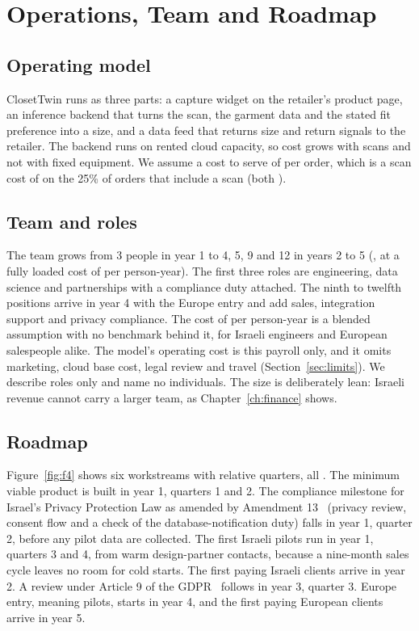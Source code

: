 \chapter{Operations, Team and Roadmap}\label{ch:ops}

\section{Operating model}\label{sec:opmodel}
ClosetTwin runs as three parts: a capture widget on the retailer's product page, an inference backend that turns the scan, the garment data and the stated fit preference into a size, and a data feed that returns size and return signals to the retailer. The backend runs on rented cloud capacity, so cost grows with scans and not with fixed equipment. We assume a cost to serve of  per order, which is a scan cost of  on the 25\% of orders that include a scan (both ).

\section{Team and roles}\label{sec:team}
The team grows from 3 people in year 1 to 4, 5, 9 and 12 in years 2 to 5 (, at a fully loaded cost of  per person-year). The first three roles are engineering, data science and partnerships with a compliance duty attached. The ninth to twelfth positions arrive in year 4 with the Europe entry and add sales, integration support and privacy compliance. The cost of  per person-year is a blended assumption with no benchmark behind it, for Israeli engineers and European salespeople alike. The model's operating cost is this payroll only, and it omits marketing, cloud base cost, legal review and travel (Section~\ref{sec:limits}). We describe roles only and name no individuals. The size is deliberately lean: Israeli revenue cannot carry a larger team, as Chapter~\ref{ch:finance} shows.

\section{Roadmap}\label{sec:roadmap}
Figure~\ref{fig:f4} shows six workstreams with relative quarters, all . The minimum viable product is built in year 1, quarters 1 and 2. The compliance milestone for Israel's Privacy Protection Law as amended by Amendment 13~\cite{il_amend13_2024} (privacy review, consent flow and a check of the database-notification duty) falls in year 1, quarter 2, before any pilot data are collected. The first Israeli pilots run in year 1, quarters 3 and 4, from warm design-partner contacts, because a nine-month sales cycle leaves no room for cold starts. The first paying Israeli clients arrive in year 2. A review under Article 9 of the GDPR~\cite{gdpr2016} follows in year 3, quarter 3. Europe entry, meaning pilots, starts in year 4, and the first paying European clients arrive in year 5.


